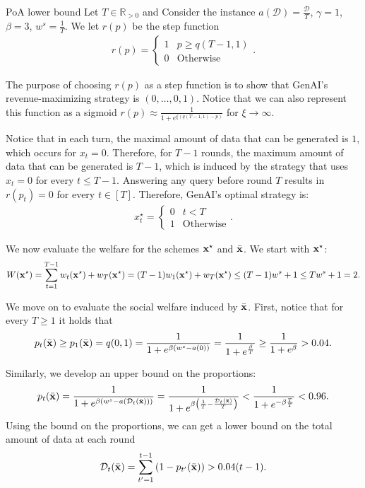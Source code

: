 \begin{proofof}{PoA lower bound}
Let $T \in \mathbb{R}_{> 0}$ and Consider the instance $a(\mathcal{D}) = \frac{\mathcal{D}}{T}$, $\gamma = 1$, $\beta = 3$, $w^s = \frac{1}{T}$. We let $r(p)$ be the step function
\begin{align*}
r(p) = \begin{cases}
    1 & \mbox{$p \geq q(T-1, 1)$} \\
    0 & \mbox{Otherwise}
\end{cases}.
\end{align*}

The purpose of choosing $r(p)$ as a step function is to show that GenAI's revenue-maximizing strategy is $(0, \ldots, 0, 1)$. Notice that we can also represent this function as a sigmoid $r(p) \approx \frac{1}{1+e^{\xi \left(q(T-1, 1) - p \right)}}$ for $\xi \rightarrow \infty$.

Notice that in each turn, the maximal amount of data that can be generated is $1$, which occurs for $x_t = 0$. Therefore, for $T-1$ rounds, the maximum amount of data that can be generated is $T-1$, which is induced by the strategy that uses $x_t = 0$ for every $t \leq T-1$.
Answering any query before round $T$ results in $r(p_t) = 0$ for every $t \in [T]$. Therefore, GenAI's optimal strategy is:
\begin{align*}
    x^\star_t = \begin{cases}
        0 & \mbox{$t < T$} \\
        1 & \mbox{Otherwise}
    \end{cases}.
\end{align*}

We now evaluate the welfare for the schemes ${\bf{x}}^\star$ and $\Bar{{\bf{x}}}$.
We start with ${\bf{x}}^\star$:
\begin{align*}
W({\bf{x}}^\star) = \sum_{t=1}^{T-1} w_t({\bf{x}}^\star) + w_T({\bf{x}}^\star) = (T-1)w_1({\bf{x}}^\star) + w_T({\bf{x}}^\star) \leq (T-1)w^s + 1 \leq T w^s + 1 = 2.
\end{align*}

We move on to evaluate the social welfare induced by $\Bar{{\bf{x}}}$. First, notice that for every $T \geq 1$ it holds that
\begin{align*}
p_t(\Bar{{\bf{x}}}) \geq p_1(\Bar{{\bf{x}}}) = q(0, 1) = \frac{1}{1+e^{\beta (w^s - a(0))}} = \frac{1}{1+e^{\frac{\beta}{T}}} \geq \frac{1}{1+e^\beta} > 0.04.
\end{align*}

Similarly, we develop an upper bound on the proportions:
\begin{align*}
p_t(\Bar{{\bf{x}}}) = \frac{1}{1 + e^{\beta \left(w^s - a(\mathcal{D}_t(\Bar{{\bf{x}}})) \right)}} = \frac{1}{1 + e^{\beta \left(\frac{1}{T} - \frac{\mathcal{D}_t(\Bar{{\bf{x}}})}{T}\right)}} < \frac{1}{1 + e^{-\beta \frac{T}{T}}} < 0.96.
\end{align*}
Using the bound on the proportions, we can get a lower bound on the total amount of data at each round
\begin{align*}
\mathcal{D}_t(\Bar{{\bf{x}}}) = \sum_{t' = 1}^{t - 1} \left(1 - p_{t'}(\Bar{{\bf{x}}}) \right) > 0.04(t-1).
\end{align*}


\end{proofof}
